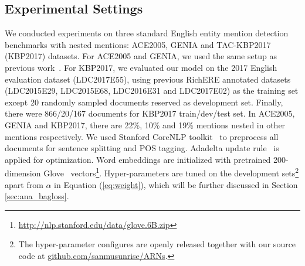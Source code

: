 \documentclass[11pt,a4paper]{article}
\begin{document}
\subsection{Experimental Settings}
We conducted experiments on three standard English entity mention detection benchmarks with nested mentions: ACE2005, GENIA and TAC-KBP2017 (KBP2017) datasets. For ACE2005 and GENIA, we used the same setup as previous work~\cite{N18-1131,D18-1124,D18-1019,N18-1079}. For KBP2017, we evaluated our model on the 2017 English evaluation dataset (LDC2017E55), using previous RichERE annotated datasets (LDC2015E29, LDC2015E68, LDC2016E31 and LDC2017E02) as the training set except 20 randomly sampled documents reserved as development set. Finally, there were 866/20/167 documents for KBP2017 train/dev/test set. In ACE2005, GENIA and KBP2017, there are 22\%, 10\% and 19\% mentions nested in other mentions respectively. We used Stanford CoreNLP toolkit~\cite{manning2014stanford} to preprocess all documents for sentence splitting and POS tagging. Adadelta update rule~\cite{zeiler2012adadelta} is applied for optimization. Word embeddings are initialized with pretrained 200-dimension Glove~\cite{pennington2014glove} vectors\footnote{\url{http://nlp.stanford.edu/data/glove.6B.zip}}. Hyper-parameters are tuned on the development sets\footnote{The hyper-parameter configures are openly released together with our source code at \url{github.com/sanmusunrise/ARNs}.} apart from $\alpha$ in Equation (\ref{eq:weight}), which will be further discussed in Section \ref{sec:ana_bagloss}.
\end{document}
